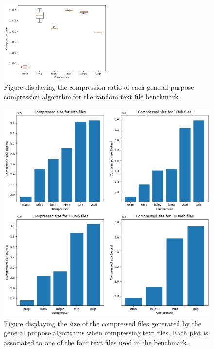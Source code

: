         \begin{figure}
            \centering
            \includegraphics[width=0.5\textwidth]{figs/random_text_comp_ratio.png}
            \caption[Figure displaying the compression ratio of each general purpose compression algorithm for the random text file benchmark.] {Figure displaying the compression ratio of each general purpose compression algorithm for the random text file benchmark.}
            \label{fig:random_text_comp_ratio}
        \end{figure}

        \begin{figure}[h]
            \centering
            \includegraphics[width=1\textwidth]{figs/text_comp_size.png}
            \caption[Figure displaying the size of the compressed files generated by the general purpose algorithms when compressing text files.] {Figure displaying the size of the compressed files generated by the general purpose algorithms when compressing text files. Each plot is associated to one of the four text files used in the benchmark.}
            \label{fig:text_comp_size}
        \end{figure}


